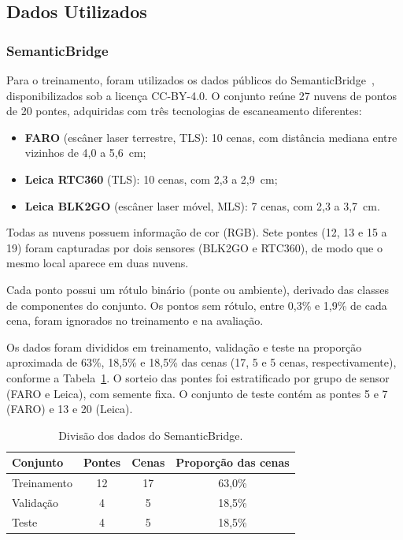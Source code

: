 \documentclass[conference]{IEEEtran}
\begin{document}
\subsection{Dados Utilizados}
\subsubsection{SemanticBridge}

Para o treinamento, foram utilizados os dados públicos do SemanticBridge~\cite{SemanticBridge}, disponibilizados sob a licença CC-BY-4.0. O conjunto reúne 27 nuvens de pontos de 20 pontes, adquiridas com três tecnologias de escaneamento diferentes:
\begin{itemize}
	\item \textbf{FARO} (escâner laser terrestre, TLS): 10 cenas, com distância mediana entre vizinhos de 4,0 a 5,6~cm;
	\item \textbf{Leica RTC360} (TLS): 10 cenas, com 2,3 a 2,9~cm;
	\item \textbf{Leica BLK2GO} (escâner laser móvel, MLS): 7 cenas, com 2,3 a 3,7~cm.
\end{itemize}
Todas as nuvens possuem informação de cor (RGB). Sete pontes (12, 13 e 15 a 19) foram capturadas por dois sensores (BLK2GO e RTC360), de modo que o mesmo local aparece em duas nuvens.

Cada ponto possui um rótulo binário (ponte ou ambiente), derivado das classes de componentes do conjunto. Os pontos sem rótulo, entre 0,3\% e 1,9\% de cada cena, foram ignorados no treinamento e na avaliação.

Os dados foram divididos em treinamento, validação e teste na proporção aproximada de 63\%, 18,5\% e 18,5\% das cenas (17, 5 e 5 cenas, respectivamente), conforme a Tabela~\ref{tab:divisao}. O sorteio das pontes foi estratificado por grupo de sensor (FARO e Leica), com semente fixa. O conjunto de teste contém as pontes 5 e 7 (FARO) e 13 e 20 (Leica).

\begin{table}[htbp]
	\centering
	\caption{Divisão dos dados do SemanticBridge.}
	\label{tab:divisao}
	\begin{tabular}{lccc}
		\toprule
		Conjunto & Pontes & Cenas & Proporção das cenas \\
		\midrule
		Treinamento & 12 & 17 & 63,0\% \\
		Validação   &  4 &  5 & 18,5\% \\
		Teste       &  4 &  5 & 18,5\% \\
		\bottomrule
	\end{tabular}
\end{table}
\end{document}
